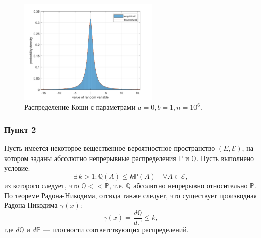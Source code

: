 \documentclass[oneside, final, 12pt]{article}
\def\P{{\mathbb{P} }}
\def\Q{{\mathbb{Q} }}
\begin{document}
	\begin{figure}[h!]
		\centering
		\includegraphics[width=0.6\textwidth]{../code/Task_4/pict/cauchy_vis_ex.png}
		\caption{Распределение Коши с параметрами $a=0, b =1, n=10^6.$}
    \end{figure}

\subsubsection{Пункт 2}
	
	Пусть имеется некоторое вещественное вероятностное пространство $(E, \mathcal{E})$, на котором заданы 
	абсолютно непрерывные распределения $\P$ и $\Q$. Пусть выполнено условие: 
	$$
		 \exists\, k >1: \Q(A) \leqslant k \P(A)\quad \forall A\in \mathcal{E},
	$$
	из которого следует, что $\Q<<\P$, т.е. $\Q$ абсолютно непрерывно относительно $\P$. По теореме 
	Радона-Никодима, отсюда также следует, что существует производная 
	Радона-Никодима $\gamma(x):$
	$$
		\gamma(x) = \dfrac{d\Q}{d\P} \leqslant k,
	$$
	где $d\Q$ и $d\P$ --- плотности  соответствующих распределений.
\end{document}
